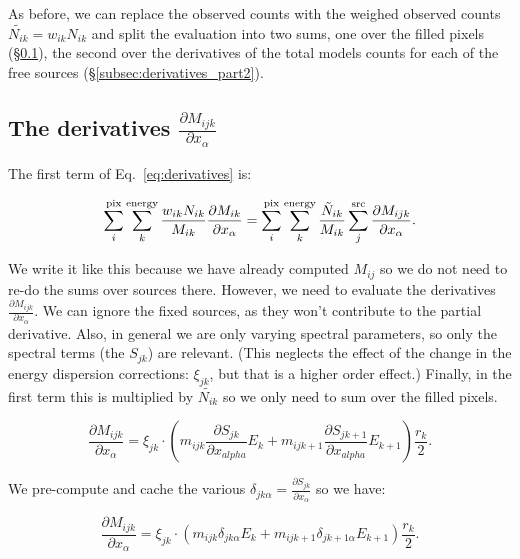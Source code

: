 \documentclass[preprint]{aastex}
\begin{document}
\noindent As before, we can replace the observed counts with the
weighed observed counts $\tilde{N_{ik}} = w_{ik} N_{ik}$ and split the
evaluation into two sums, one over the filled pixels
(\S\ref{subsec:derivatives_part1}), the second over the derivatives of
the total models counts for each of the free sources
(\S\ref{subsec:derivatives_part2}).


\subsection{The derivatives \texorpdfstring{$\frac{\partial M_{ijk}}{\partial x_{\alpha}}$}{dM/dx}}\label{subsec:derivatives_part1}

The first term of Eq.~\ref{eq:derivatives} is:

\begin{equation}
  \sum_i^{\rm pix} \sum_k^{\rm energy} \frac{w_{ik} N_{ik}}{M_{ik}} \frac{\partial M_{ik}}{\partial x_{\alpha}} = 
  \sum_i^{\rm pix} \sum_k^{\rm energy} \frac{\tilde{N}_{ik}}{M_{ik}} \sum_j^{\rm src} \frac{\partial M_{ijk}}{\partial x_{\alpha}}.
\end{equation}

We write it like this because we have already computed $M_{ij}$ so we
do not need to re-do the sums over sources there.  However, we need to
evaluate the derivatives $\frac{\partial M_{ijk}}{\partial x_{\alpha}}$.
We can ignore the fixed sources, as they won't contribute to the
partial derivative.  Also, in general we are only varying spectral
parameters, so only the spectral terms (the $S_{jk}$) are relevant.
(This neglects the effect of the change in the energy dispersion
corrections: $\xi_{jk}$, but that is a higher order effect.)  Finally,
in the first term this is multiplied by $\tilde{N_{ik}}$ so we only
need to sum over the filled pixels.

\begin{equation}
  \frac{\partial M_{ijk}}{\partial x_{\alpha}} = \xi_{jk} \cdot (m_{ijk} \frac{\partial S_{jk}}{\partial x_{alpha}} E_k +  m_{ijk+1} \frac{\partial S_{jk+1}}{\partial x_{alpha}} E_{k+1}) \frac{r_k}{2}.
\end{equation}

\noindent We pre-compute and cache the various $\delta_{jk\alpha} = \frac{\partial S_{jk}}{\partial x_{\alpha}}$ so we have:

\begin{equation}
  \frac{\partial M_{ijk}}{\partial x_{\alpha}} = \xi_{jk} \cdot (m_{ijk} \delta_{jk\alpha} E_k +  m_{ijk+1} \delta_{jk+1\alpha} E_{k+1}) \frac{r_k}{2}.
\end{equation}
\end{document}
